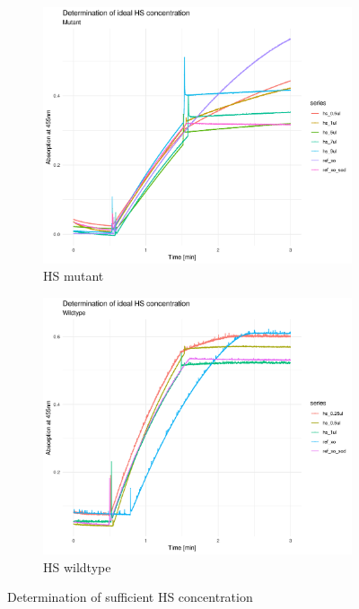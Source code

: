 \begin{figure}
    \centering
    \begin{subfigure}{0.75\textwidth}
	\includegraphics[width=\textwidth]{img/activity_mut_hs.png}
	\caption{HS mutant}
	\label{fig:activity_mut_hs}
    \end{subfigure}

    \begin{subfigure}{0.75\textwidth}
	\includegraphics[width=\textwidth]{img/activity_wt_hs.png}
	\caption{HS wildtype}
	\label{fig:activity_wt_hs}
    \end{subfigure}
    \caption{Determination of sufficient HS concentration}
    \label{fig:activity_hs}
\end{figure}

